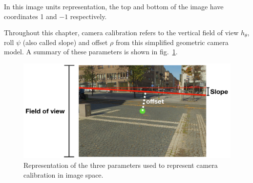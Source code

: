 
%
%
In this image units representation, the top and bottom of the image have coordinates 1 and $-1$ respectively. 

Throughout this chapter, camera calibration refers to the vertical field of view $h_{\theta}$, roll $\psi$ (also called slope) and offset $\rho$ from this simplified geometric camera model. A summary of these parameters is shown in fig.~\ref{fig:camera_parameters_summary}.

\begin{figure}
\centering
\includegraphics[width=\linewidth]{figures/cvpr18_parameters.png}
\caption[Camera parameters]{Representation of the three parameters used to represent camera calibration in image space.}
\label{fig:camera_parameters_summary}
\end{figure}
